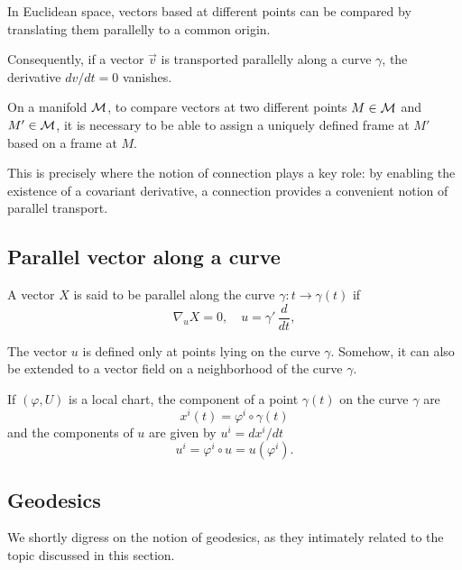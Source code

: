 In Euclidean space, vectors based at different points can be compared by translating them parallelly to a common origin. 

Consequently, if a vector 
$\Vec{v}$ is transported parallelly along a curve $\gamma$, the derivative $dv/dt=0$ vanishes. 





On a manifold $\mathcal{M}$, to compare vectors at two different points $M\in \mathcal{M}$ and $M'\in \mathcal{M}$, it is necessary to be able to assign a uniquely defined frame at  $M'$ based on a frame at $M$. 

This is precisely where the notion  of connection plays a key role: by enabling the existence of a covariant derivative, a connection provides a convenient notion of parallel transport.

\subsection{Parallel vector along a curve} 
\begin{definition}
A vector $X$ is said to be parallel along the curve $\gamma : t\to \gamma(t)$ if
 \begin{equation}
 \nabla_{u}X=0,\quad u=\gamma'\,\frac{d}{dt},
 \end{equation}
 \end{definition}
 
 \begin{remark}
 The vector $u$ is defined only at points lying on the curve $\gamma$. Somehow, it can also be extended to a vector field on a neighborhood of the curve $\gamma$. 
 \end{remark}
 
 If $(\varphi,U)$ is a local chart, the component of a point $\gamma(t)$ on the curve $\gamma$  are \[x^{i} (t)=\varphi^{i}\circ\gamma(t)\] and the components of $u$ are given by $u^{i}=dx^{i}/dt$
\[u^{i}= \varphi^{i}\circ u=u( \varphi^{i}).\]

 \subsection{Geodesics}
 We shortly digress on the notion of geodesics, as they intimately related to the topic discussed in this section. 
 
